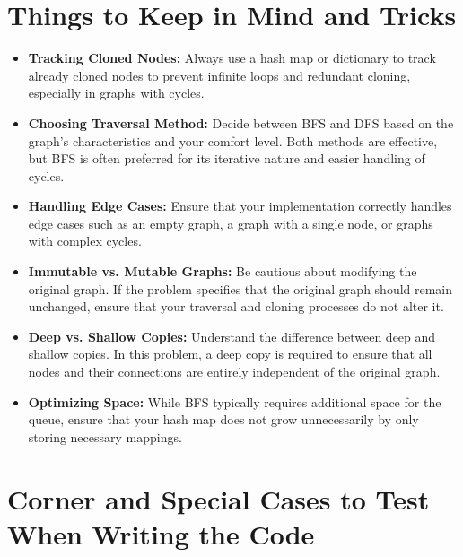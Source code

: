 \section*{Things to Keep in Mind and Tricks}

\begin{itemize}
    \item \textbf{Tracking Cloned Nodes:} Always use a hash map or dictionary to track already cloned nodes to prevent infinite loops and redundant cloning, especially in graphs with cycles.
    
    \item \textbf{Choosing Traversal Method:} Decide between BFS and DFS based on the graph's characteristics and your comfort level. Both methods are effective, but BFS is often preferred for its iterative nature and easier handling of cycles.
    
    \item \textbf{Handling Edge Cases:} Ensure that your implementation correctly handles edge cases such as an empty graph, a graph with a single node, or graphs with complex cycles.
    
    \item \textbf{Immutable vs. Mutable Graphs:} Be cautious about modifying the original graph. If the problem specifies that the original graph should remain unchanged, ensure that your traversal and cloning processes do not alter it.
    
    \item \textbf{Deep vs. Shallow Copies:} Understand the difference between deep and shallow copies. In this problem, a deep copy is required to ensure that all nodes and their connections are entirely independent of the original graph.
    
    \item \textbf{Optimizing Space:} While BFS typically requires additional space for the queue, ensure that your hash map does not grow unnecessarily by only storing necessary mappings.
\end{itemize}

\section*{Corner and Special Cases to Test When Writing the Code}


